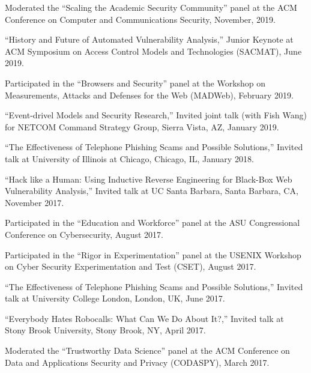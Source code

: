 \documentclass[11pt,letterpaper,sans]{moderncv}
\begin{document}
\begin{etaremune}

  \item Moderated the ``Scaling the Academic Security Community'' panel at the ACM Conference on Computer and Communications Security, November, 2019. 

  \item ``History and Future of Automated Vulnerability Analysis,'' Junior Keynote at ACM Symposium on Access Control Models and Technologies (SACMAT), June 2019.

  \item Participated in the ``Browsers and Security'' panel at the Workshop on Measurements, Attacks and Defenses for the Web (MADWeb), February 2019.

  \item ``Event-drivel Models and Security Research,'' Invited joint talk (with Fish Wang) for NETCOM Command Strategy Group, Sierra Vista, AZ, January 2019.

  \item ``The Effectiveness of Telephone Phishing Scams and Possible Solutions,''
    Invited talk at University of Illinois at Chicago, Chicago, IL, January 2018.

  \item ``Hack like a Human: Using Inductive Reverse Engineering for Black-Box Web Vulnerability Analysis,'' Invited talk at UC Santa Barbara, Santa Barbara, CA, November 2017.

  \item Participated in the ``Education and Workforce'' panel at the
    ASU Congressional Conference on Cybersecurity, August 2017. 
  
  \item Participated in the ``Rigor in Experimentation'' panel at the
    USENIX Workshop on Cyber Security Experimentation and Test (CSET),
    August 2017.

  \item ``The Effectiveness of Telephone Phishing Scams and Possible Solutions,''
    Invited talk at University College London, London, UK, June
    2017.
  
  \item ``Everybody Hates Robocalls: What Can We Do About It?,''
    Invited talk at Stony Brook University, Stony Brook, NY, April
    2017.

  \item Moderated the ``Trustworthy Data Science'' panel at the ACM
    Conference on Data and Applications Security and Privacy
    (CODASPY), March 2017.


\end{etaremune}
\end{document}
